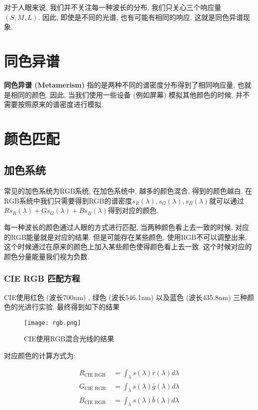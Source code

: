 对于人眼来说, 我们并不关注每一种波长的分布, 我们只关心三个响应量$(S,M,L)$. 因此, 即使是不同的光谱, 也有可能有相同的响应, 这就是同色异谱现象. 

\section{同色异谱}

\textbf{同色异谱 (Metamerism) }指的是两种不同的谱密度分布得到了相同响应量, 也就是相同的颜色. 因此, 当我们使用一些设备 (例如屏幕) 模拟其他颜色的时候, 并不需要按照原来的谱密度进行模拟. 

\section{颜色匹配}

\subsection{加色系统}

常见的加色系统为RGB系统, 在加色系统中, 越多的颜色混合, 得到的颜色越白. 在RGB系统中我们只需要得到RGB的谱密度$s_R(\lambda), s_G(\lambda), s_B(\lambda)$就可以通过$R s_{R}(\lambda)+G s_{G}(\lambda)+B s_{B}(\lambda)$得到对应的颜色. 

每一种波长的颜色通过人眼的方式进行匹配, 当两种颜色看上去一致的时候, 对应的RGB能量就是对应的结果. 但是可能存在某些颜色, 使用RGB不可以调整出来, 这个时候通过在原来的颜色上加入某些颜色使得颜色看上去一致. 这个时候对应的颜色分量能量我们视为负数. 

\subsubsection{CIE RGB 匹配方程}

CIE使用红色 (波长700nm) , 绿色 (波长546.1nm) 以及蓝色 (波长435.8nm) 三种颜色的光进行实验. 最终得到如下的结果

\begin{figure}[H]
	\centering
	\texttt{[image: rgb.png]}
	\caption{CIE使用RGB混合光线的结果}
	\label{fig:rgb}
\end{figure}

对应颜色的计算方式为: 

\begin{equation}
	\begin{split}
		R_{\mathrm{CIE} \text { RGB }} &=\int_{\lambda} s(\lambda) \bar{r}(\lambda) d \lambda \\
		G_{\mathrm{CIE} \text { RGB }} &=\int_{\lambda} s(\lambda) \bar{g}(\lambda) d \lambda \\
		B_{\mathrm{CIE} \text { RGB }} &=\int_{\lambda} s(\lambda) \bar{b}(\lambda) d \lambda
	\end{split}
\end{equation}

